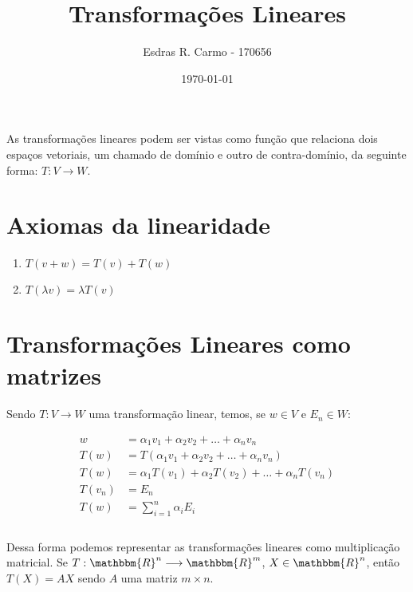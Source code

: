 \documentclass{article}
\author{Esdras R. Carmo - 170656}
\title{Transformações Lineares}
\date{\today}
\newcommand{\REAL} {\mathbbm{R}}
\begin{document}
    \maketitle
    \paragraph{}
    As transformações lineares podem ser vistas como função que relaciona dois espaços vetoriais,
    um chamado de domínio e outro de contra-domínio, da seguinte forma: $T: V \longrightarrow W$.

    \section{Axiomas da linearidade}
        \begin{enumerate}
            \item $T(v + w) = T(v) + T(w)$
            \item $T(\lambda v) = \lambda T(v)$
        \end{enumerate}

    \section{Transformações Lineares como matrizes}
        \paragraph{}
        Sendo $T: V \longrightarrow W$ uma transformação linear, temos, se $w \in V$ e $E_n \in W$:

        \begin{align*}
            w &= \alpha_1 v_1 + \alpha_2 v_2 + \dots + \alpha_n v_n\\
            T(w) &= T(\alpha_1 v_1 + \alpha_2 v_2 + \dots + \alpha_n v_n)\\
            T(w) &= \alpha_1 T(v_1) + \alpha_2 T(v_2) + \dots + \alpha_n T(v_n)\\
            T(v_n) &= E_n\\
            T(w) &= \sum_{i = 1}^n \alpha_i E_i\\
        \end{align*}

        \paragraph{}
        Dessa forma podemos representar as transformações lineares como multiplicação matricial.
        Se $T: \REAL^n \longrightarrow \REAL^m$, $X \in \REAL^n$, então $T(X) = AX$ sendo $A$ uma
        matriz $m \times n$.
\end{document}
